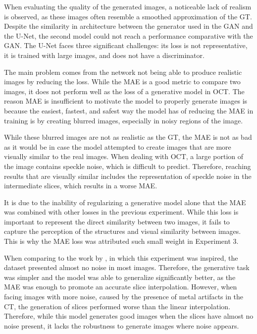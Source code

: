 When evaluating the quality of the generated images, a noticeable lack of realism is observed, as these images often resemble a smoothed approximation of the GT. Despite the similarity in architecture between the generator used in the GAN and the U-Net, the second model could not reach a performance comparative with the GAN. The U-Net faces three significant challenges: its loss is not representative, it is trained with large images, and does not have a discriminator.
\par
The main problem comes from the network not being able to produce realistic images by reducing the loss. While the MAE is a good metric to compare two images, it does not perform well as the loss of a generative model in OCT. The reason MAE is insufficient to motivate the model to properly generate images is because the easiest, fastest, and safest way the model has of reducing the MAE in training is by creating blurred images, especially in noisy regions of the image.
\par
While these blurred images are not as realistic as the GT, the MAE is not as bad as it would be in case the model attempted to create images that are more visually similar to the real images. When dealing with OCT, a large portion of the image contains speckle noise, which is difficult to predict. Therefore, reaching results that are visually similar includes the representation of speckle noise in the intermediate slices, which results in a worse MAE.
\par
It is due to the inability of regularizing a generative model alone that the MAE was combined with other losses in the previous experiment. While this loss is important to represent the direct similarity between two images, it fails to capture the perception of the structures and visual similarity between images. This is why the MAE loss was attributed such small weight in Experiment 3.
\par
When comparing to the work by \textcite{Nishimoto2024}, in which this experiment was inspired, the dataset presented almost no noise in most images. Therefore, the generative task was simpler and the model was able to generalize significantly better, as the MAE was enough to promote an accurate slice interpolation. However, when facing images with more noise, caused by the presence of metal artifacts in the CT, the generation of slices performed worse than the linear interpolation. Therefore, while this model generates good images when the slices have almost no noise present, it lacks the robustness to generate images where noise appears.
